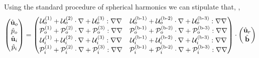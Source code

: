 Using the standard procedure of spherical harmonics we can stipulate that, \citep{leal2007advanced,raja2010inertial,nadim1991motion},
\begin{align*}
    \begin{pmatrix}
        \hat{\textbf{u}}_{o}\\
        \hat{p}_{o}\\
        \hat{\textbf{u}}_{i}\\
        \hat{p}_{i}
    \end{pmatrix}
    =
    \begin{pmatrix}
        \mathcal{U}_{o}^{(1)} + \mathcal{U}_{o}^{(2)}\cdot \mathbf{\nabla} + \mathcal{U}_{o}^{(3)} :\mathbf{\nabla}\mathbf{\nabla} &
        \mathcal{U}_{o}^\text{(b-1)} + \mathcal{U}_{o}^\text{(b-2)}\cdot \mathbf{\nabla} + \mathcal{U}_{o}^\text{(b-3)} :\mathbf{\nabla}\mathbf{\nabla} \\
        \mathcal{P}_{o}^{(1)} + \mathcal{P}_{o}^{(2)}\cdot \mathbf{\nabla} + \mathcal{P}_{o}^{(3)} :\mathbf{\nabla}\mathbf{\nabla} &
        \mathcal{P}_{o}^\text{(b-1)} + \mathcal{P}_{o}^\text{(b-2)}\cdot \mathbf{\nabla} + \mathcal{P}_{o}^\text{(b-3)} :\mathbf{\nabla}\mathbf{\nabla} \\
        \mathcal{U}_{i}^{(1)} + \mathcal{U}_{i}^{(2)}\cdot \mathbf{\nabla} + \mathcal{U}_{i}^{(3)} :\mathbf{\nabla}\mathbf{\nabla} &
        \mathcal{U}_{i}^\text{(b-1)} + \mathcal{U}_{i}^\text{(b-2)}\cdot \mathbf{\nabla} + \mathcal{U}_{i}^\text{(b-3)} :\mathbf{\nabla}\mathbf{\nabla} \\
        \mathcal{P}_{i}^{(1)} + \mathcal{P}_{i}^{(2)}\cdot \mathbf{\nabla} + \mathcal{P}_{i}^{(3)} :\mathbf{\nabla}\mathbf{\nabla} &
        \mathcal{P}_{i}^\text{(b-1)} + \mathcal{P}_{i}^\text{(b-2)}\cdot \mathbf{\nabla} + \mathcal{P}_{i}^\text{(b-3)} :\mathbf{\nabla}\mathbf{\nabla} \\
    \end{pmatrix}
    \cdot 
    \begin{pmatrix}
        \hat{\textbf{u}}_r\\
        \hat{\textbf{b}}
    \end{pmatrix}
\end{align*}
